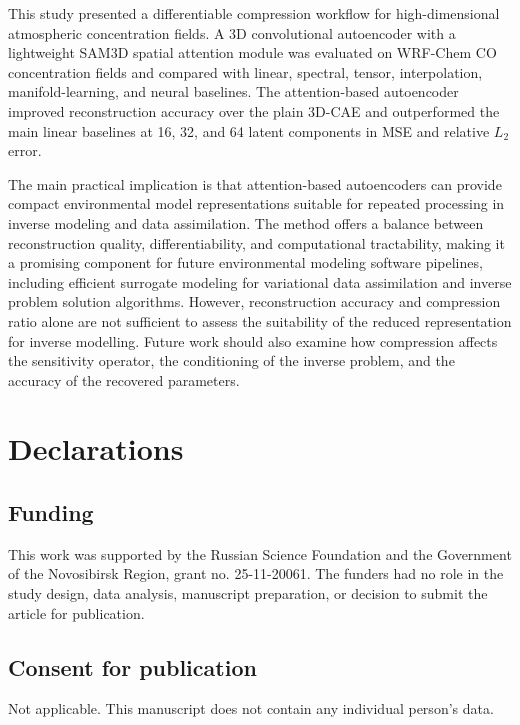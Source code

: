 \documentclass[pdflatex,sn-mathphys-num]{sn-jnl}%
\theoremstyle{thmstyleone}%
\theoremstyle{thmstyletwo}%
\theoremstyle{thmstylethree}%
\begin{document}
This study presented a differentiable compression workflow for high-dimensional atmospheric concentration fields. A 3D convolutional autoencoder with a lightweight SAM3D spatial attention module was evaluated on WRF-Chem CO concentration fields and compared with linear, spectral, tensor, interpolation, manifold-learning, and neural baselines. The attention-based autoencoder improved reconstruction accuracy over the plain 3D-CAE and outperformed the main linear baselines at 16, 32, and 64 latent components in MSE and relative   $L_2$ error.

The main practical implication is that attention-based autoencoders can provide compact environmental model representations suitable for repeated processing in inverse modeling and data assimilation. The method offers a balance between reconstruction quality, differentiability, and computational tractability, making it a promising component for future environmental modeling software pipelines, including efficient surrogate modeling for variational data assimilation and inverse problem solution algorithms.
However, reconstruction accuracy and compression ratio alone are not sufficient to assess the suitability of the reduced representation for inverse modelling. Future work should also examine how compression affects the sensitivity operator, the conditioning of the inverse problem, and the accuracy of the recovered parameters.








\backmatter

\section{Declarations}

\subsection*{Funding}

This work was supported by the Russian Science Foundation and the Government of the Novosibirsk Region, grant no. 25-11-20061. The funders had no role in the study design, data analysis, manuscript preparation, or decision to submit the article for publication.

\subsection*{Consent for publication}
Not applicable. This manuscript does not contain any individual person’s data.
\end{document}
